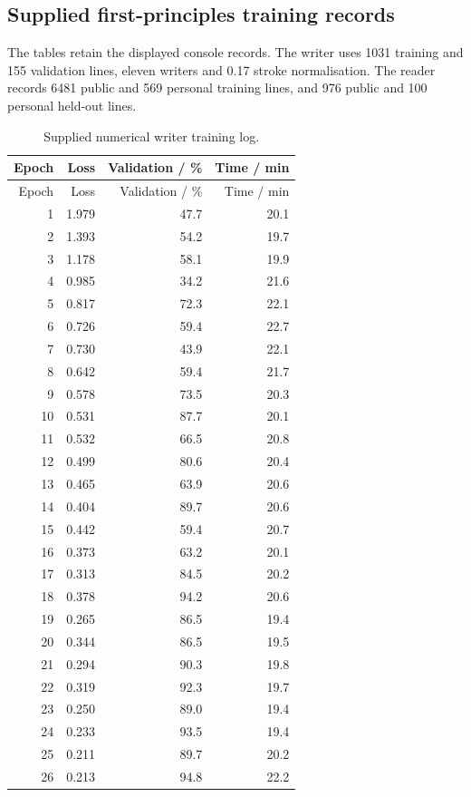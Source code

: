 \subsection{Supplied first-principles training records}\label{app:training-records}
The tables retain the displayed console records. The writer uses 1031 training and 155 validation lines, eleven writers and 0.17 stroke normalisation. The reader records 6481 public and 569 personal training lines, and 976 public and 100 personal held-out lines.
\begin{longtable}{rrrr}
\caption{Supplied numerical writer training log.}\label{tab:app-author-log}\\
\toprule Epoch & Loss & Validation / \% & Time / min\\\midrule\endfirsthead
\toprule Epoch & Loss & Validation / \% & Time / min\\\midrule\endhead
1 & 1.979 & 47.7 & 20.1\\
2 & 1.393 & 54.2 & 19.7\\
3 & 1.178 & 58.1 & 19.9\\
4 & 0.985 & 34.2 & 21.6\\
5 & 0.817 & 72.3 & 22.1\\
6 & 0.726 & 59.4 & 22.7\\
7 & 0.730 & 43.9 & 22.1\\
8 & 0.642 & 59.4 & 21.7\\
9 & 0.578 & 73.5 & 20.3\\
10 & 0.531 & 87.7 & 20.1\\
11 & 0.532 & 66.5 & 20.8\\
12 & 0.499 & 80.6 & 20.4\\
13 & 0.465 & 63.9 & 20.6\\
14 & 0.404 & 89.7 & 20.6\\
15 & 0.442 & 59.4 & 20.7\\
16 & 0.373 & 63.2 & 20.1\\
17 & 0.313 & 84.5 & 20.2\\
18 & 0.378 & 94.2 & 20.6\\
19 & 0.265 & 86.5 & 19.4\\
20 & 0.344 & 86.5 & 19.5\\
21 & 0.294 & 90.3 & 19.8\\
22 & 0.319 & 92.3 & 19.7\\
23 & 0.250 & 89.0 & 19.4\\
24 & 0.233 & 93.5 & 19.4\\
25 & 0.211 & 89.7 & 20.2\\
26 & 0.213 & 94.8 & 22.2\\

\end{longtable}
